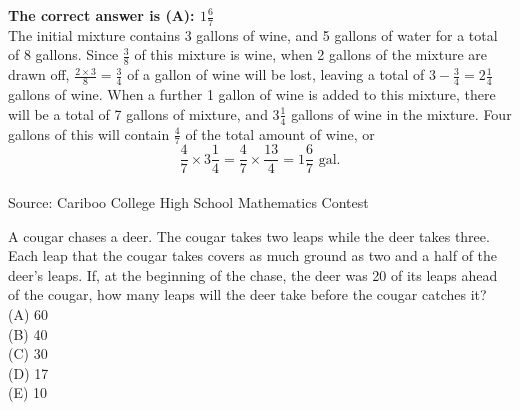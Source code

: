 \documentclass{article}
\begin{document}

\textbf{The correct answer is (A): $1\frac{6}{7}$}\\[1 ex]
The initial mixture contains 3 gallons of wine, and 5 gallons of water for a total of 8 gallons.  Since $\frac{3}{8}$ of this mixture is wine, when 2 gallons of the mixture are drawn off, $\frac{2\times3}{8}=\frac{3}{4}$ of a gallon of wine will be lost, leaving a total of $3-\frac{3}{4}=2\frac{1}{4}$ gallons of wine.  When a further 1 gallon of wine is added to this mixture, there will be a total of 7 gallons of mixture, and $3\frac{1}{4}$ gallons of wine in the mixture. Four gallons of this will contain $\frac{4}{7}$ of the total amount of wine, or
\begin{equation*}
\frac{4}{7}\times3\frac{1}{4}=\frac{4}{7}\times\frac{13}{4}=1\frac{6}{7}\textrm{ gal.}
\end{equation*}
\\[5 ex]

\scriptsize
Source: Cariboo College High School Mathematics Contest

\normalsize
A cougar chases a deer. The cougar takes two leaps while the deer takes three. Each leap that the cougar takes covers as much ground as two and a half of the deer's leaps. If, at the beginning of the chase, the deer was 20 of its leaps ahead of the cougar, how many leaps will the deer take before the cougar catches it?\\
(A) 60\\
(B) 40\\
(C) 30\\
(D) 17\\
(E) 10\\

\end{document}
